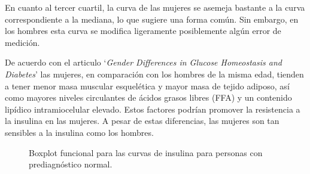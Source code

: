 En cuanto al tercer cuartil, la curva de las mujeres se asemeja bastante a la curva correspondiente a la mediana, lo que sugiere una forma común. Sin embargo, en los hombres esta curva se modifica ligeramente posiblemente algún error de medición. 

De acuerdo con el articulo `\textit{Gender Differences in Glucose Homeostasis and Diabetes}' \cite{GenderDifferences2018} las mujeres, en comparación con los hombres de la misma edad, tienden a tener menor masa muscular esquelética y mayor masa de tejido adiposo, así como mayores niveles circulantes de ácidos grasos libres (FFA) y un contenido lipídico intramiocelular elevado. Estos factores podrían promover la resistencia a la insulina en las mujeres. A pesar de estas diferencias, las mujeres son tan sensibles a la insulina como los hombres.


\begin{figure}[H]
 \centering
    \caption{Boxplot funcional para las curvas de insulina para personas con prediagnóstico normal.}
    \label{fig:insulinaNormal}
\end{figure}



